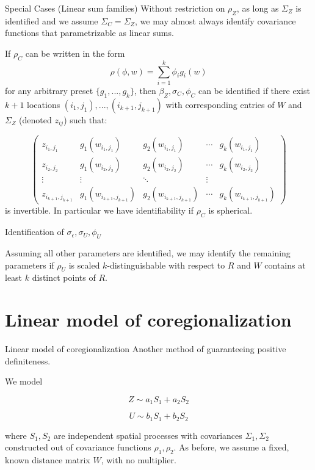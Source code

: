\documentclass[10 pt]{beamer}
\begin{document}
\begin{frame}{Special Cases (Linear sum families)}
Without restriction on $\rho_Z$, as long as $\Sigma_Z$ is identified and we assume $\Sigma_C = \Sigma_Z$, we may almost always identify covariance functions that parametrizable as linear sums.\bigskip

If $\rho_C$ can be written in the form \[\rho(\phi, w) = \sum_{i=1}^k \phi_i g_i(w)\] for any arbitrary preset $\{g_1,...,g_k\}$, then $\beta_Z, \sigma_C, \phi_C$ can be identified if there exist $k+1$ locations $(i_1,j_1),...,(i_{k+1},j_{k+1})$ with corresponding entries of $W$ and $\Sigma_Z$ (denoted $z_{ij}$) such that:

\[\begin{pmatrix}
z_{i_1,j_1} & g_1(w_{i_1,j_1}) & g_2(w_{i_1,j_1}) & \cdots & g_k(w_{i_1,j_1}) \\
z_{i_2,j_2} & g_1(w_{i_2,j_2}) & g_2(w_{i_2,j_2}) & \cdots & g_k(w_{i_2,j_2}) \\
\vdots & \vdots & \ddots & \vdots \\
z_{i_{k+1},j_{k+1}} & g_1(w_{i_{k+1},j_{k+1}}) & g_2(w_{i_{k+1},j_{k+1}}) & \cdots & g_k(w_{i_{k+1},j_{k+1}})
\end{pmatrix}\] is invertible. In particular we have identifiability if $\rho_C$ is spherical.
\end{frame}

\begin{frame}{Identification of $\sigma_\epsilon, \sigma_U, \phi_U$}

Assuming all other parameters are identified, we may identify the remaining parameters if $\rho_U$ is scaled $k$-distinguishable with respect to $R$ and $W$ contains at least $k$ distinct points of $R$.

\end{frame}

\section{Linear model of coregionalization}

\begin{frame}{Linear model of coregionalization}
Another method of guaranteeing positive definiteness. \bigskip

We model 

\[Z \sim a_1 S_1 + a_2S_2\]

\[U \sim b_1 S_1 + b_2S_2\]

where $S_1, S_2$ are independent spatial processes with covariances $\Sigma_1, \Sigma_2$ constructed out of covariance functions $\rho_1, \rho_2$. As before, we assume a fixed, known distance matrix $W$, with no multiplier. 
\end{frame}
\end{document}
